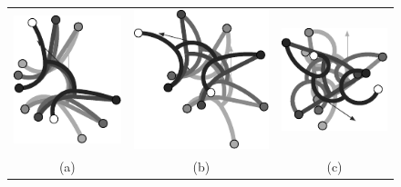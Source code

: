 \documentclass[10pt,a4paper]{article}
\begin{document}
\begin{figure}
\begin{center}
\begin{tabular}{ccc}
\includegraphics[scale=1]{../Pics/py/Curve_f_ori_1.pdf}&
\includegraphics[scale=1]{../Pics/py/Curve_f_ori_01.pdf}&
\includegraphics[scale=1]{../Pics/py/Curve_f_ori_0001.pdf}\\
(a) & (b) & (c)\\
\end{tabular}


\end{center}
\end{figure}
\end{document}
